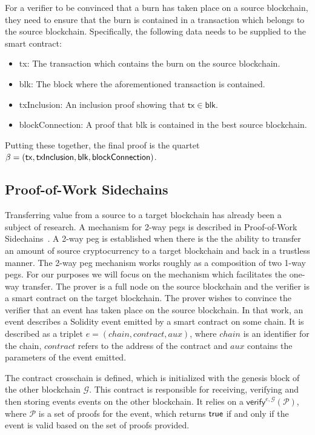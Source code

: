 For a verifier to be convinced that a burn has taken place on a source blockchain, they need to ensure that the burn is contained in a transaction which belongs to the source blockchain. Specifically, the following data needs to be supplied to the smart contract:

\begin{itemize}
  \item \textsf{tx}: The transaction which contains the burn on the source blockchain.
  \item \textsf{blk}: The block where the aforementioned transaction is contained.
  \item \textsf{txInclusion}: An inclusion proof showing that $\mathsf{tx} \in \mathsf{blk}$.
  \item \textsf{blockConnection}: A proof that \textsf{blk} is contained in the best source blockchain.
\end{itemize}

Putting these together, the final proof is the quartet $\beta = \sf(tx, txInclusion, blk, blockConnection)$.

\subsection{Proof-of-Work Sidechains}
Transferring value from a source to a target blockchain has already been a subject of research. A mechanism for 2-way pegs is described in Proof-of-Work Sidechains~\cite{pow-sidechains}. A 2-way peg is established when there is the the ability to transfer an amount of source cryptocurrency to a target blockchain and back in a trustless manner. The 2-way peg mechanism works roughly as a composition of two 1-way pegs. For our purposes we will focus on the mechanism which facilitates the one-way transfer. The prover is a full node on the source blockchain and the verifier is a smart contract on the target blockchain. The prover wishes to convince the verifier that an event has taken place on the source blockchain. In that work, an event describes a Solidity event emitted by a smart contract on some chain. It is described as a triplet $e = (chain, contract, aux)$, where $chain$ is an identifier for the chain, $contract$ refers to the address of the contract and $aux$ contains the parameters of the event emitted.

The contract \textsf{crosschain} is defined, which is initialized with the genesis block of the other blockchain $\mathcal{G}$. This contract is responsible for receiving, verifying and then storing events events on the other blockchain. It relies on a $\mathsf{verify}^{e,\mathcal{G}}(\mathcal{P})$, where $\mathcal{P}$ is a set of proofs for the event, which returns $\mathsf{true}$ if and only if the event is valid based on the set of proofs provided.

